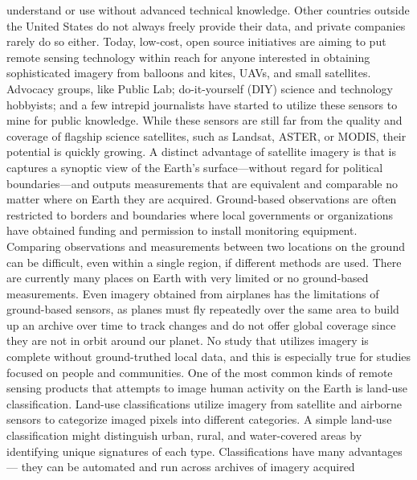 \begin{itemize}
understand or use without advanced technical knowledge. Other countries
outside the United States do not always freely provide their data, and private
companies rarely do so either. Today, low-cost, open source initiatives
are aiming to put remote sensing technology within reach for anyone interested
in obtaining sophisticated imagery from balloons and kites, UAVs, and
small satellites. Advocacy groups, like Public Lab; do-it-yourself (DIY) science
and technology hobbyists; and a few intrepid journalists have started
to utilize these sensors to mine for public knowledge. While these sensors
are still far from the quality and coverage of flagship science satellites, such
as Landsat, ASTER, or MODIS, their potential is quickly growing.
A distinct advantage of satellite imagery is that is captures a synoptic view
of the Earth's surface—without regard for political boundaries—and outputs
measurements that are equivalent and comparable no matter where
on Earth they are acquired. Ground-based observations are often restricted
to borders and boundaries where local governments or organizations have
obtained funding and permission to install monitoring equipment. Comparing
observations and measurements between two locations on the
ground can be difficult, even within a single region, if different methods
are used. There are currently many places on Earth with very limited or no
ground-based measurements. Even imagery obtained from airplanes has
the limitations of ground-based sensors, as planes must fly repeatedly over
the same area to build up an archive over time to track changes and do not
offer global coverage since they are not in orbit around our planet.
No study that utilizes imagery is complete without ground-truthed local
data, and this is especially true for studies focused on people and communities.
One of the most common kinds of remote sensing products that
attempts to image human activity on the Earth is land-use classification.
Land-use classifications utilize imagery from satellite and airborne sensors
to categorize imaged pixels into different categories. A simple land-use
classification might distinguish urban, rural, and water-covered areas by
identifying unique signatures of each type. Classifications have many advantages—
they can be automated and run across archives of imagery acquired


\end{itemize}
